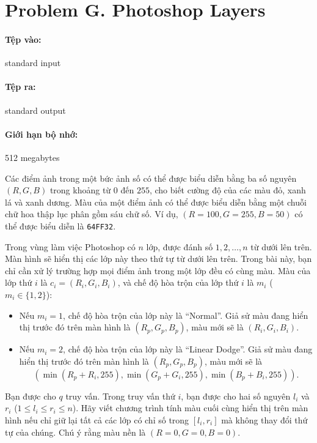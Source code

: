 \documentclass[11pt]{article}
\begin{document}
\section{Problem G. Photoshop Layers}

\paragraph{Tệp vào:} standard input
\paragraph{Tệp ra:} standard output
\paragraph{Giới hạn bộ nhớ:} 512 megabytes

Các điểm ảnh trong một bức ảnh số có thể được biểu diễn bằng ba số nguyên
\((R,G,B)\) trong khoảng từ \(0\) đến \(255\), cho biết cường độ của các màu
đỏ, xanh lá và xanh dương. Màu của một điểm ảnh có thể được biểu diễn bằng
một chuỗi chữ hoa thập lục phân gồm sáu chữ số. Ví dụ,
\((R=100,G=255,B=50)\) có thể được biểu diễn là \texttt{64FF32}.

Trong vùng làm việc Photoshop có \(n\) lớp, được đánh số \(1,2,\ldots,n\) từ
dưới lên trên. Màn hình sẽ hiển thị các lớp này theo thứ tự từ dưới lên trên.
Trong bài này, bạn chỉ cần xử lý trường hợp mọi điểm ảnh trong một lớp đều có
cùng màu. Màu của lớp thứ \(i\) là \(c_i=(R_i,G_i,B_i)\), và chế độ hòa trộn
của lớp thứ \(i\) là \(m_i\) (\(m_i\in\{1,2\}\)):
\begin{itemize}
  \item Nếu \(m_i=1\), chế độ hòa trộn của lớp này là ``Normal''. Giả sử màu
  đang hiển thị trước đó trên màn hình là \((R_p,G_p,B_p)\), màu mới sẽ là
  \((R_i,G_i,B_i)\).
  \item Nếu \(m_i=2\), chế độ hòa trộn của lớp này là ``Linear Dodge''. Giả
  sử màu đang hiển thị trước đó trên màn hình là \((R_p,G_p,B_p)\), màu mới
  sẽ là
  \[
    (\min(R_p+R_i,255),\min(G_p+G_i,255),\min(B_p+B_i,255)).
  \]
\end{itemize}

Bạn được cho \(q\) truy vấn. Trong truy vấn thứ \(i\), bạn được cho hai số
nguyên \(l_i\) và \(r_i\) (\(1\le l_i\le r_i\le n\)). Hãy viết chương trình
tính màu cuối cùng hiển thị trên màn hình nếu chỉ giữ lại tất cả các lớp có
chỉ số trong \([l_i,r_i]\) mà không thay đổi thứ tự của chúng. Chú ý rằng màu
nền là \((R=0,G=0,B=0)\).
\end{document}
